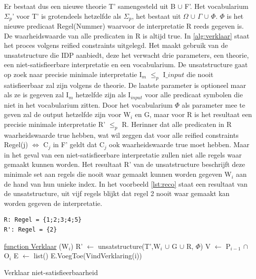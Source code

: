 Er bestaat dus een nieuwe theorie T' samengesteld uit B $\cup$ F'. Het vocabularium $\Sigma_{p}$' voor T' is grotendeels hetzelfde als $\Sigma_{p}$, het bestaat uit $\Omega$ $\cup$ $\Gamma$ $\cup$ $\Phi$. $\Phi$ is het nieuwe predicaat Regel(Nummer) waarvoor de interpretatie R reeds gegeven is. De waarheidswaarde van alle predicaten in R is altijd true. In \ref{alg:verklaar} staat het proces volgens reified constraints uitgelegd. Het maakt gebruik van de unsatstructure die IDP aanbiedt, deze het verwacht drie parameters, een theorie, een niet-satisfieerbare interpretatie en een vocabularium. De unsatstructure gaat op zoek naar precisie minimale interpretatie I$_{m}$ $\leq_{p}$ I$\_{input}$ die nooit satisfieerbaar zal zijn volgens de theorie. De laatste parameter is optioneel maar als ze is gegeven zal I$_{m}$ hetzelfde zijn als I$_{input}$ voor alle predicaat symbolen die niet in het vocabularium zitten. Door het vocabularium $\Phi$ als parameter mee te geven zal de output hetzelfde zijn voor W$_{i}$ en G, maar voor R is het resultaat een precisie minimale interpretatie R' $\leq_{p}$ R. Herinner dat alle predicaten in R waarheidswaarde true hebben, wat wil zeggen dat voor alle reified constraints Regel(j) $\Leftrightarrow$ C$_{j}$ in F' geldt dat C$_{j}$ ook waarheidswaarde true moet hebben. Maar in het geval van een niet-satisfieerbare interpretatie zullen niet alle regels waar gemaakt kunnen worden. Het resultaat R' van de unsatstructure beschrijft deze minimale set aan regels die nooit waar gemaakt kunnen worden gegeven W$_{i}$ aan de hand van hun unieke index. In het voorbeeld \ref{lst:reco} staat een resultaat van de unsatstructure, uit vijf regels blijkt dat regel 2 nooit waar gemaakt kan worden gegeven de interpretatie.

\begin{lstlisting}[mathescape, caption=Unsatstructure voorbeeld\label{lst:reco}, frame=single]
R: Regel = {1;2;3;4;5}
R': Regel = {2}
\end{lstlisting}

\begin{algorithm}
	\underline{function Verklaar} (W$_{i}$)\;
	R' $\leftarrow$ unsatstructure(T',W$_{i}$ $\cup$ G $\cup$ R, $\Phi$)\;
	V $\leftarrow$ P$_{i-1}$ $\cap$ O$_{i}$\;
	E $\leftarrow$ list()\;
		{
		E.VoegToe(VindVerklaring(i))\;
		}
	\caption{Verklaar niet-satisfieerbaarheid\label{alg:verklaar}}
\end{algorithm}

